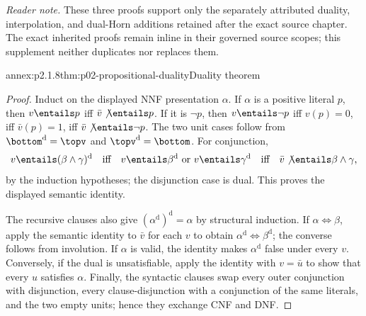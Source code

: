 \noindent\textit{Reader note.} These three proofs support only the separately
attributed duality, interpolation, and dual-Horn additions retained after the exact
source chapter.  The exact inherited proofs remain inline in their governed
source scopes; this supplement neither duplicates nor replaces them.

\begin{annexitem}{annex:p2.1.8}{thm:p02-propositional-duality}{Duality theorem}
\begin{proof}
Induct on the displayed NNF presentation \(\alpha\).  If \(\alpha\) is a
positive literal \(p\), then
\(v\entails p\) iff \(\bar v\not\entails p\).  If it is \(\neg p\), then
\(v\entails\neg p\) iff \(v(p)=0\), iff
\(\bar v(p)=1\), iff \(\bar v\not\entails\neg p\).  The two unit
cases follow from \(\bottom^{\mathrm d}=\topv\) and
\(\topv^{\mathrm d}=\bottom\).  For conjunction,
\[
 v\entails(\beta\land\gamma)^{\mathrm d}
 \quad\text{iff}\quad
 v\entails\beta^{\mathrm d}\text{ or }v\entails\gamma^{\mathrm d}
 \quad\text{iff}\quad
 \bar v\not\entails\beta\land\gamma,
\]
by the induction hypotheses; the disjunction case is dual.  This proves the
displayed semantic identity.

The recursive clauses also give \((\alpha^{\mathrm d})^{\mathrm d}=\alpha\)
by structural induction.  If \(\alpha\Leftrightarrow\beta\), apply the
semantic identity to \(\bar v\) for each \(v\) to obtain
\(\alpha^{\mathrm d}\Leftrightarrow\beta^{\mathrm d}\); the converse follows
from involution.  If \(\alpha\) is valid, the identity makes
\(\alpha^{\mathrm d}\) false under every \(v\).  Conversely, if the dual is
unsatisfiable, apply the identity with \(v=\bar u\) to show that every \(u\)
satisfies \(\alpha\).  Finally, the syntactic clauses swap every outer
conjunction with disjunction, every clause-disjunction with a conjunction of
the same literals, and the two empty units; hence they exchange CNF and DNF.
\end{proof}
\end{annexitem}

